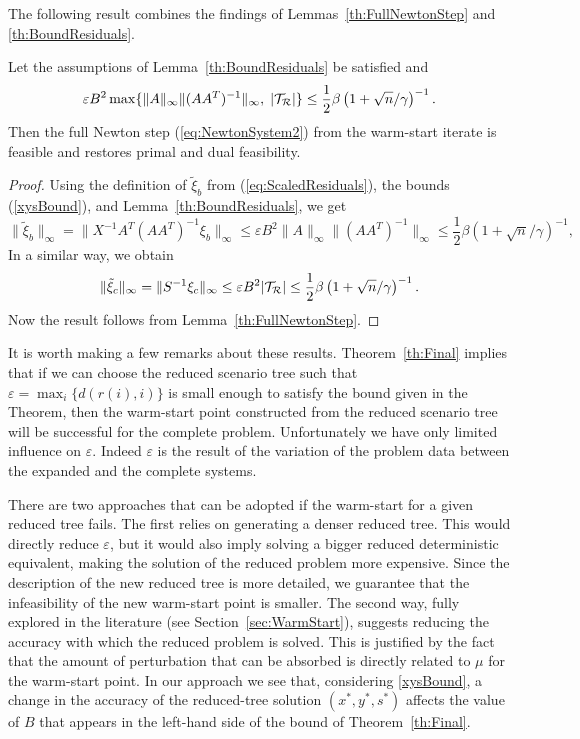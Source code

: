 The following result combines the findings of Lemmas~\ref{th:FullNewtonStep} 
and \ref{th:BoundResiduals}. 
%
\begin{theorem}  \label{th:Final}
Let the assumptions of Lemma~\ref{th:BoundResiduals} be satisfied and 
\[
\varepsilon B^2 \max\{\|A\|_\infty\|(AA^T)^{-1}\|_\infty, \; |\mathcal{T}_\mathcal{R}|\} 
   \le \frac{1}{2} \beta \left(1+\sqrt{n} / \gamma \right)^{-1}.
\]
Then the full Newton step (\ref{eq:NewtonSystem2})
from the warm-start iterate is feasible 
and restores primal and dual feasibility.
\end{theorem}
%
\begin{proof}
Using the definition of $\tilde{\xi}_b$ from (\ref{eq:ScaledResiduals}),
the bounds (\ref{xysBound}), and Lemma~\ref{th:BoundResiduals}, we get
\[
\| \tilde{\xi}_b \|_{\infty} = \| X^{-1} A^T (AA^T)^{-1} \xi_b \|_{\infty} 
    \le
    \varepsilon B^2 \|A\|_{\infty} \|(AA^T)^{-1}\|_{\infty} 
    \le \frac{1}{2} \beta \left(1+\sqrt{n} / \gamma \right)^{-1},
\]
In a similar way, we obtain
\[
  \| \tilde{\xi}_c \|_{\infty} = \| S^{-1} \xi_c \|_\infty
                  \le \varepsilon B^2 |\mathcal{T}_\mathcal{R}|
                  \le \frac{1}{2} \beta \left(1+\sqrt{n} / \gamma \right)^{-1}.
 \]
Now the result follows from  Lemma~\ref{th:FullNewtonStep}. 
\end{proof}

It is worth making a few remarks about these results.
Theorem~\ref{th:Final} implies that if we can choose the reduced
scenario tree such that $\varepsilon = \max_i\{d(r(i),i)\}$ is small enough
to satisfy the bound given in the Theorem, then the warm-start point
constructed from the reduced scenario tree will be successful for the
complete problem. Unfortunately we have only limited influence on
$\varepsilon$. Indeed $\varepsilon$ is the result of the variation of
the problem data between the expanded and the complete systems.

There are two approaches that can be adopted if the warm-start
for a given reduced tree fails.
The first relies on generating a denser reduced tree. This would
directly reduce $\varepsilon$, but it would also imply solving
a bigger reduced deterministic equivalent, making the solution of the
reduced problem more expensive.
Since the description of the new reduced tree is more detailed,
we guarantee that the infeasibility of the new warm-start point
is smaller.
The second way, fully explored in the literature 
(see Section~\ref{sec:WarmStart}), suggests reducing the accuracy
with which the reduced problem is solved. This is justified by the fact
that the amount of perturbation that can be absorbed is directly related
to $\mu$ for the warm-start point.
In our approach we see that, considering \eqref{xysBound},
a change in the accuracy of the reduced-tree solution $(x^*, y^*, s^*)$
affects the value of $B$ that appears in the left-hand side of
the bound of Theorem~\ref{th:Final}.

